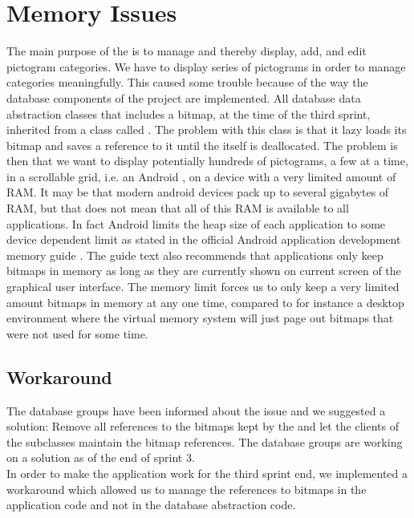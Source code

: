 
\section{Memory Issues}
\label{sec:memory_issues}

The main purpose of the \ct is to manage and thereby display, add, and edit pictogram categories. We have to display series of pictograms in order to manage categories meaningfully. This caused some trouble because of the way the database components of the project are implemented. All database data abstraction classes that includes a bitmap, at the time of the third sprint, inherited from a class called . The problem with this class is that it lazy loads its bitmap and saves a reference to it until the  itself is deallocated. The problem is then that we want to display potentially hundreds of pictograms, a few at a time, in a scrollable grid, i.e. an Android , on a device with a very limited amount of RAM. It may be that modern android devices pack up to several gigabytes of RAM, but that does not mean that all of this RAM is available to all applications. In fact Android limits the heap size of each application to some device dependent limit as stated in the official Android application development memory guide \parencite{android_memory}. The guide text also recommends that applications only keep bitmaps in memory as long as they are currently shown on current screen of the graphical user interface. The memory limit forces us to only keep a very limited amount bitmaps in memory at any one time, compared to for instance a desktop environment where the virtual memory system will just page out bitmaps that were not used for some time. 

\subsection{Workaround}
\label{subsec:pictogram_workaround}

The database groups have been informed about the issue and we suggested a solution: Remove all references to the bitmaps kept by the  and let the clients of the  subclasses maintain the bitmap references. The database groups are working on a solution as of the end of sprint 3. \\

In order to make the \ct application work for the third sprint end, we implemented a workaround which allowed us to manage the references to bitmaps in the application code and not in the database abstraction code. \\

